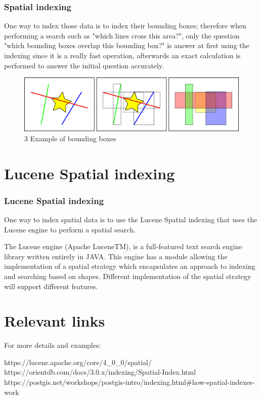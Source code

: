 \documentclass{beamer}
\begin{document}
\begin{frame}
\frametitle{Spatial indexing}
One way to index those data is to index their bounding boxes; therefore when performing a search such as "which lines cross this area?", only the question "which bounding boxes overlap this bounding box?" is answer at first using the indexing since it is a really fast operation, afterwards an exact calculation is performed to answer the initial question accurately.

\begin{figure}[h]
	\includegraphics[scale=.5]{example_bounding_boxes.png}
	\caption{3 Example of bounding boxes}
\end{figure}
\end{frame}



\section{Lucene Spatial indexing}

\begin{frame}
\frametitle{Lucene Spatial indexing}
One way to index spatial data is to use the Lucene Spatial indexing that uses the Lucene engine to perform a spatial search.

The Lucene engine (Apache LuceneTM), is a full-featured text search engine library written entirely in JAVA. This engine has a module allowing the implementation of a spatial strategy which encapsulates an approach to indexing and searching based on shapes. Different implementation of the spatial strategy will support different features.
\end{frame}


\section{Relevant links}

\begin{frame}
For more details and examples:
\begin{thebibliography}{00}
	 https://lucene.apache.org/core/4\_0\_0/spatial/
	 https://orientdb.com/docs/3.0.x/indexing/Spatial-Index.html
	 https://postgis.net/workshops/postgis-intro/indexing.html\#how-spatial-indexes-work
\end{thebibliography}
\end{frame}
\end{document}

